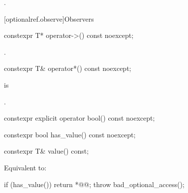 \begin{addedblock}
\begin{itemdescr}
\pnum
\returns
{}.
\end{itemdescr}



[optionalref.observe]{Observers}

\begin{itemdecl}
constexpr T* operator->() const noexcept;
\end{itemdecl}

\begin{itemdescr}
  \pnum
  \returns
  .

\end{itemdescr}

\begin{itemdecl}
constexpr T& operator*() const noexcept;
\end{itemdecl}

\begin{itemdescr}
   \pnum
   \expects
    is 

   \pnum
   \returns
   .

\end{itemdescr}

\begin{itemdecl}
constexpr explicit operator bool() const noexcept;
\end{itemdecl}

\begin{itemdescr}
  \pnum
  \returns
\end{itemdescr}

\begin{itemdecl}
constexpr bool has_value() const noexcept;
\end{itemdecl}

\begin{itemdescr}
  \pnum
  \returns
\end{itemdescr}

\begin{itemdecl}
constexpr T& value() const;
\end{itemdecl}

\begin{itemdescr}
  \pnum
  \effects
  Equivalent to:
  \begin{codeblock}
if (has_value()) {
  return *@@;
}
throw bad_optional_access();
  \end{codeblock}
\end{itemdescr}


\end{addedblock}

